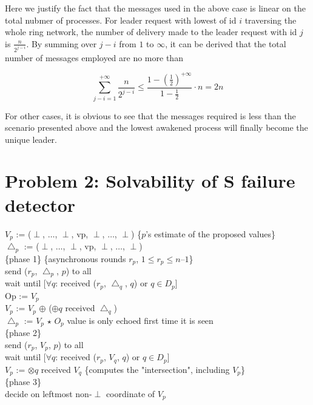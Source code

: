 \documentclass[11pt,a4paper]{article}
\begin{document}
Here we justify the fact that the messages used in the above case is linear on
the total nubmer of processes. For leader request with lowest of id $i$
traversing the whole ring network, the number of delivery made to the leader
request with id $j$ is $\frac{n}{2^{j-i}}$. By summing over $j-i$ from $1$ to
$\infty$, it can be derived that the total number of messages employed are no
more than 

$$ \sum_{j-i=1}^{+\infty}\frac{n}{2^{j-i}} \leq
\frac{1-(\frac{1}{2})^{+\infty}}{1-\frac{1}{2}} \cdot n = 2n$$

For other cases, it is obvious to see that the messages required is less than
the scenario presented above and the lowest awakened process will finally
become the unique leader.

\newpage

\section{Problem 2: Solvability of S failure detector}

\begin{algorithm}
$V_p$ := ($\perp$, $\dots$, $\perp$, vp, $\perp$, $\dots$, $\perp$) \{$p$'s
    estimate of the proposed values\} \\

$\bigtriangleup _p$ := ($\perp$, $\dots$, $\perp$, vp, $\perp$, $\dots$, $\perp$)  \\
\{phase 1\} \{asynchronous rounds $r_p$, $1 \leq r_p \leq n – 1$\} \\
    { send ($r_p$, $\bigtriangleup _p$, $p$) to all \\
      wait until [$\forall q$: received ($r_p$, $\bigtriangleup_q$, $q$) or
        $q \in D_p$]  \\
    Op := $V_p$ \\
    $V_p$ := $V_p$ $\oplus$ ($\oplus q$ received $\bigtriangleup_q$) \\
    $\bigtriangleup _p$ := $V_p$ $\star$ $O_p$ {value is only echoed ﬁrst time
        it is seen}  \\
    }
\{phase 2\} \\
send ($r_p$, $V_p$, $p$) to all \\
wait until [$\forall q$: received ($r_p$, $V_q$, $q$) or $q \in D_p$] \\
$V_p$ := $\otimes q$ received $V_q$ \{computes the "intersection", including
    $V_p$\} \\
\{phase 3\} \\
decide on leftmost non-$\perp$ coordinate of $V_p$ \\
\end{algorithm}
\end{document}
